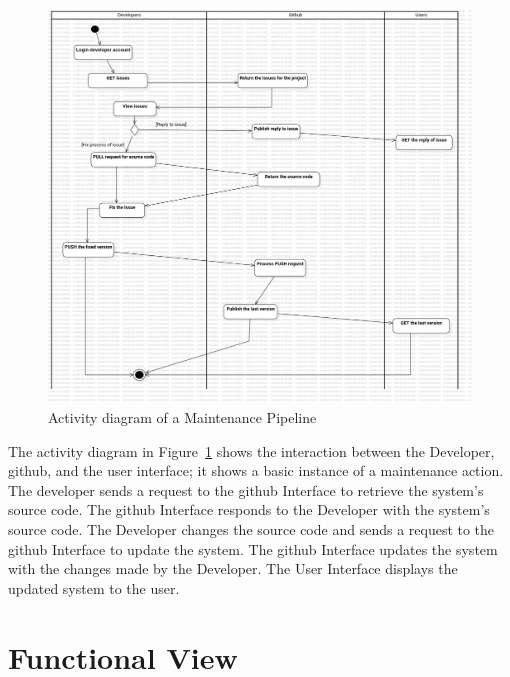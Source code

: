 \begin{figure}[H]
    \centering
    \includegraphics[width=1\textwidth]{Figures/ActivityDiagram_maintanencepipeline.png}
    \caption{Activity diagram of a Maintenance Pipeline}\label{fig:ActivityDiagram_maintanencepipeline}
\end{figure}

The activity diagram in Figure~\ref{fig:ActivityDiagram_maintanencepipeline} shows the interaction between the Developer, \gls{github}, and the user interface; it shows a basic instance of a maintenance action. The developer sends a request to the \gls{github} Interface to retrieve the system's source code. The \gls{github} Interface responds to the Developer with the system's source code. The Developer changes the source code and sends a request to the \gls{github} Interface to update the system. The \gls{github} Interface updates the system with the changes made by the Developer. The User Interface displays the updated system to the user.



\section{Functional View} 

